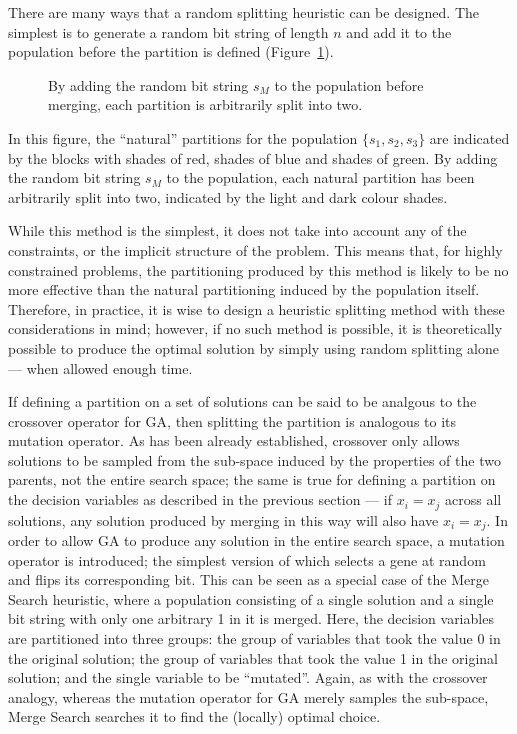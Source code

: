\documentclass[journal]{IEEEtran}
\begin{document}
\medskip

There are many ways that a random splitting heuristic can be designed. The simplest is to generate a random bit string of length $n$ and add it to the population before the partition is defined (Figure~\ref{fig:random_split}). 

\begin{figure}[h]
\centering
{}
\caption[Splitting partitions by adding a random bit string]
       {By adding the random bit string $s_M$ to the population before merging, each partition is arbitrarily split into two.}
\label{fig:random_split}
\end{figure}

In this figure, the ``natural'' partitions for the population $\{s_1,s_2,s_3\}$ are indicated by the blocks with shades of red, shades of blue and shades of green. By adding the random bit string $s_M$ to the population, each natural partition has been arbitrarily split into two, indicated by the light and dark colour shades.

While this method is the simplest, it does not take into account any of the constraints, or the implicit structure of the problem. This means that, for highly constrained problems, the partitioning produced by this method is likely to be no more effective than the natural partitioning induced by the population itself. Therefore, in practice, it is wise to design a heuristic splitting method with these considerations in mind; however, if no such method is possible, it is theoretically possible to produce the optimal solution by simply using random splitting alone --- when allowed enough time.

\medskip

If defining a partition on a set of solutions can be said to be analgous to the crossover operator for GA, then splitting the partition is analogous to its mutation operator. As has been already established, crossover only allows solutions to be sampled from the sub-space induced by the properties of the two parents, not the entire search space; the same is true for defining a partition on the decision variables as described in the previous section --- if $x_i = x_j$ across all solutions, any solution produced by merging in this way will also have $x_i = x_j$. In order to allow GA to produce any solution in the entire search space, a mutation operator is introduced; the simplest version of which selects a gene at random and flips its corresponding bit. This can be seen as a special case of the Merge Search heuristic, where a population consisting of a single solution and a single bit string with only one arbitrary 1 in it is merged. Here, the decision variables are partitioned into three groups: the group of variables that took the value 0 in the original solution; the group of variables that took the value 1 in the original solution; and the single variable to be ``mutated''. Again, as with the crossover analogy, whereas the mutation operator for GA merely samples the sub-space, Merge Search searches it to find the (locally) optimal choice.
\end{document}
